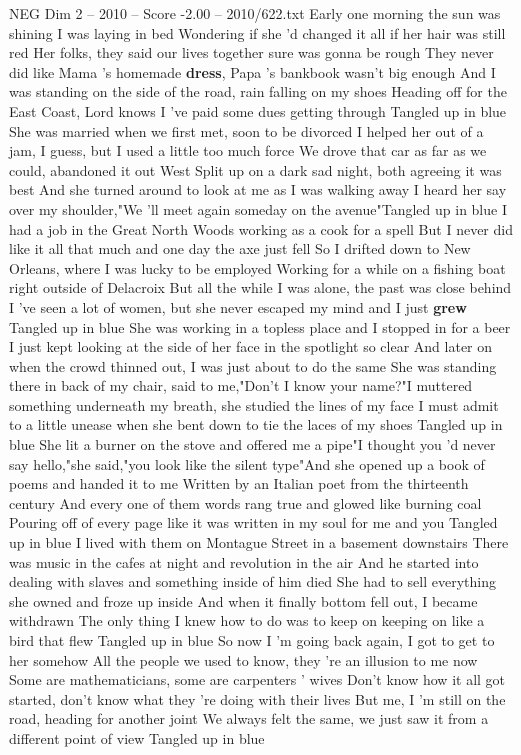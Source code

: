 \begin{textsample}{NEG Dim 2 – 2010 – Score -2.00 – 2010/622.txt}  \label{ex:f2_neg_010}
Early one morning the sun was shining I was laying in bed Wondering if she 'd changed it all if her hair was still red Her folks, they said our lives together sure was gonna be rough They never did like Mama 's homemade \textbf{dress}, Papa 's bankbook wasn't big enough And I was standing on the side of the road, rain falling on my shoes Heading off for the East Coast, Lord knows I 've paid some dues getting through Tangled up in blue She was married when we first met, soon to be divorced I helped her out of a jam, I guess, but I used a little too much force We drove that car as far as we could, abandoned it out West Split up on a dark sad night, both agreeing it was best And she turned around to look at me as I was walking away I heard her say over my shoulder,"We 'll meet again someday on the avenue"Tangled up in blue I had a job in the Great North Woods working as a cook for a spell But I never did like it all that much and one day the axe just fell So I drifted down to New Orleans, where I was lucky to be employed Working for a while on a fishing boat right outside of Delacroix But all the while I was alone, the past was close behind I 've seen a lot of women, but she never escaped my mind and I just \textbf{grew} Tangled up in blue She was working in a topless place and I stopped in for a beer I just kept looking at the side of her face in the spotlight so clear And later on when the crowd thinned out, I was just about to do the same She was standing there in back of my chair, said to me,"Don't I know your name?"I muttered something underneath my breath, she studied the lines of my face I must admit to a little unease when she bent down to tie the laces of my shoes Tangled up in blue She lit a burner on the stove and offered me a pipe"I thought you 'd never say hello,"she said,"you look like the silent type"And she opened up a book of poems and handed it to me Written by an Italian poet from the thirteenth century And every one of them words rang true and glowed like burning coal Pouring off of every page like it was written in my soul for me and you Tangled up in blue I lived with them on Montague Street in a basement downstairs There was music in the cafes at night and revolution in the air And he started into dealing with slaves and something inside of him died She had to sell everything she owned and froze up inside And when it finally bottom fell out, I became withdrawn The only thing I knew how to do was to keep on keeping on like a bird that flew Tangled up in blue So now I 'm going back again, I got to get to her somehow All the people we used to know, they 're an illusion to me now Some are mathematicians, some are carpenters ' wives Don't know how it all got started, don't know what they 're doing with their lives But me, I 'm still on the road, heading for another joint We always felt the same, we just saw it from a different point of view Tangled up in blue

\end{textsample}
